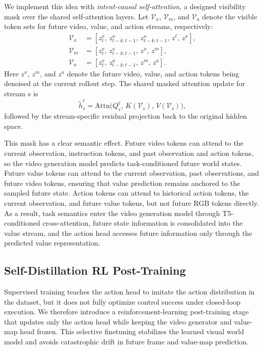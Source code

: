 We implement this idea with \emph{intent-causal self-attention}, a designed visibility mask over the shared self-attention layers. Let $\mathcal{V}_x$, $\mathcal{V}_m$, and $\mathcal{V}_a$ denote the visible token sets for future video, value, and action streams, respectively:
\begin{equation}
\begin{aligned}
\mathcal{V}_x &= \left[z_t^{o},\, z_{t-k:t-1}^{o},\, z_{t-k:t-1}^{a},\, z^{\ell},\, z^{x}\right],\\
\mathcal{V}_m &= \left[z_t^{o},\, z_{t-k:t-1}^{o},\, z^{x},\, z^{m}\right],\\
\mathcal{V}_a &= \left[z_t^{o},\, z_{t-k:t-1}^{a},\, z^{m},\, z^{a}\right].
\end{aligned}
\end{equation}
Here $z^{x}$, $z^{m}$, and $z^{a}$ denote the future video, value, and action tokens being denoised at the current rollout step. The shared masked attention update for stream $s$ is
\begin{equation}
\tilde{h}_s^\ell
=
\mathrm{Attn}\!\bigl(
Q_s^\ell,\,
K(\mathcal{V}_s),\,
V(\mathcal{V}_s)
\bigr),
\end{equation}
followed by the stream-specific residual projection back to the original hidden space.

This mask has a clear semantic effect. Future video tokens can attend to the current observation, instruction tokens, and past observation and action tokens, so the video generation model predicts task-conditioned future world states. Future value tokens can attend to the current observation, past observations, and future video tokens, ensuring that value prediction remains anchored to the sampled future state. Action tokens can attend to historical action tokens, the current observation, and future value tokens, but not future RGB tokens directly. As a result, task semantics enter the video generation model through T5-conditioned cross-attention, future state information is consolidated into the value stream, and the action head accesses future information only through the predicted value representation.


\subsection{Self-Distillation RL Post-Training}

Supervised training teaches the action head to imitate the action distribution in the dataset, but it does not fully optimize control success under closed-loop execution. We therefore introduce a reinforcement-learning post-training stage that updates only the action head while keeping the video generator and value-map head frozen. This selective finetuning stabilizes the learned visual world model and avoids catastrophic drift in future frame and value-map prediction.

